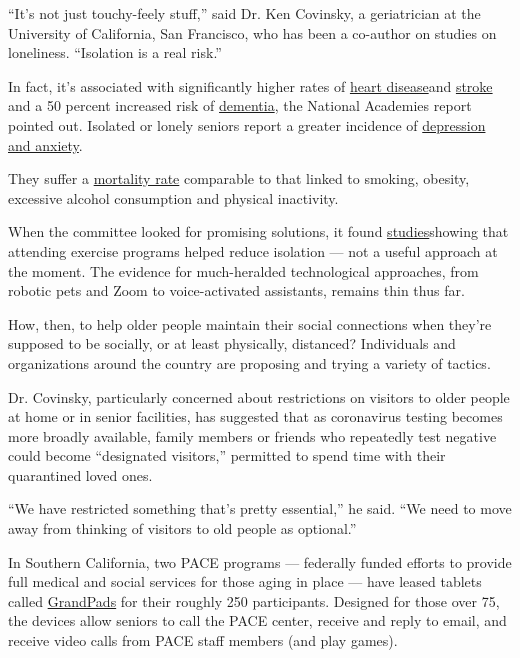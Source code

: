 ``It's not just touchy-feely stuff,'' said Dr. Ken Covinsky, a
geriatrician at the University of California, San Francisco, who has
been a co-author on studies on loneliness. ``Isolation is a real risk.''

In fact, it's associated with significantly higher rates of
\href{https://heart.bmj.com/content/102/13/987}{heart disease}and
\href{https://www.ncbi.nlm.nih.gov/pubmed/27091846}{stroke} and a 50
percent increased risk of
\href{https://www.ncbi.nlm.nih.gov/pubmed/30452410,}{dementia}, the
National Academies report pointed out. Isolated or lonely seniors report
a greater incidence of
\href{https://bmcpsychiatry.biomedcentral.com/articles/10.1186/s12888-017-1262-x}{depression
and anxiety}.

They suffer a
\href{https://journals.plos.org/plosmedicine/article?id=10.1371/journal.pmed.1000316}{mortality
rate} comparable to that linked to smoking, obesity, excessive alcohol
consumption and physical inactivity.

When the committee looked for promising solutions, it found
\href{https://journals.sagepub.com/doi/abs/10.1177/0733464818807820}{studies}showing
that attending exercise programs helped reduce isolation --- not a
useful approach at the moment. The evidence for much-heralded
technological approaches, from robotic pets and Zoom to voice-activated
assistants, remains thin thus far.

How, then, to help older people maintain their social connections when
they're supposed to be socially, or at least physically, distanced?
Individuals and organizations around the country are proposing and
trying a variety of tactics.

Dr. Covinsky, particularly concerned about restrictions on visitors to
older people at home or in senior facilities, has suggested that as
coronavirus testing becomes more broadly available, family members or
friends who repeatedly test negative could become ``designated
visitors,'' permitted to spend time with their quarantined loved ones.

``We have restricted something that's pretty essential,'' he said. ``We
need to move away from thinking of visitors to old people as optional.''

In Southern California, two PACE programs --- federally funded efforts
to provide full medical and social services for those aging in place ---
have leased tablets called \href{https://www.grandpad.net}{GrandPads}
for their roughly 250 participants. Designed for those over 75, the
devices allow seniors to call the PACE center, receive and reply to
email, and receive video calls from PACE staff members (and play games).

